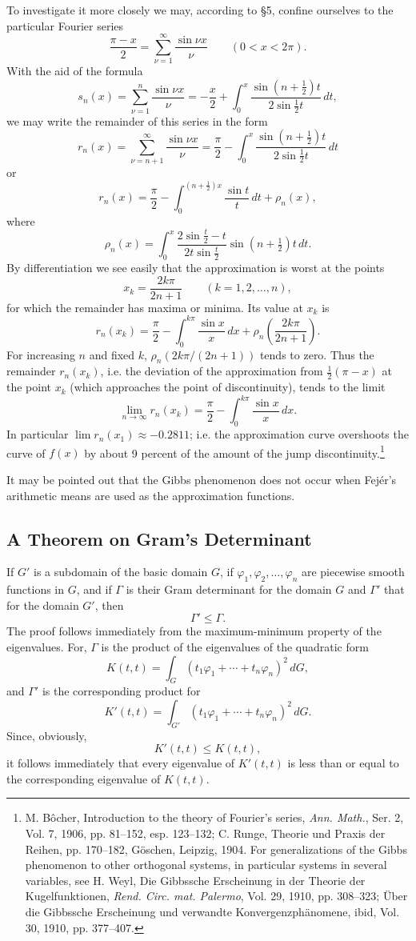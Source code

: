 To investigate it more closely we may, according to \S5, confine ourselves to the particular Fourier series
\[
\frac{\pi-x}{2}=\sum_{\nu=1}^\infty\frac{\sin\nu x}{\nu}
\qquad(0<x<2\pi).
\]
With the aid of the formula
\[
s_n(x)=\sum_{\nu=1}^n\frac{\sin\nu x}{\nu}
=-\frac{x}{2}+\int_0^x\frac{\sin(n+\tfrac12)t}{2\sin\tfrac12 t}\,dt,
\]
we may write the remainder of this series in the form
\[
r_n(x)=\sum_{\nu=n+1}^\infty\frac{\sin\nu x}{\nu}
=\frac{\pi}{2}-\int_0^x\frac{\sin(n+\tfrac12)t}{2\sin\tfrac12 t}\,dt
\]
or
\[
r_n(x)=\frac{\pi}{2}-\int_0^{(n+\tfrac12)x}\frac{\sin t}{t}\,dt+\rho_n(x),
\]
where
\[
\rho_n(x)=\int_0^x
\frac{2\sin\tfrac{t}{2}-t}{2t\sin\tfrac{t}{2}}
\sin(n+\tfrac12)t\,dt.
\]
By differentiation we see easily that the approximation is worst at the points
\[
x_k=\frac{2k\pi}{2n+1}\qquad(k=1,2,\ldots,n),
\]
for which the remainder has maxima or minima. Its value at $x_k$ is
\[
r_n(x_k)=\frac{\pi}{2}-\int_0^{k\pi}\frac{\sin x}{x}\,dx
+\rho_n\!\left(\frac{2k\pi}{2n+1}\right).
\]
For increasing $n$ and fixed $k$, $\rho_n(2k\pi/(2n+1))$ tends to zero. Thus the remainder $r_n(x_k)$, i.e. the deviation of the approximation from $\tfrac12(\pi-x)$ at the point $x_k$ (which approaches the point of discontinuity), tends to the limit
\[
\lim_{n\to\infty}r_n(x_k)
=\frac{\pi}{2}-\int_0^{k\pi}\frac{\sin x}{x}\,dx.
\]
In particular $\lim r_n(x_1)\approx-0.2811$; i.e. the approximation curve overshoots the curve of $f(x)$ by about 9 percent of the amount of the jump discontinuity.\footnote{M. B\^ocher, Introduction to the theory of Fourier's series, \emph{Ann. Math.}, Ser. 2, Vol. 7, 1906, pp. 81--152, esp. 123--132; C. Runge, Theorie und Praxis der Reihen, pp. 170--182, G\"oschen, Leipzig, 1904. For generalizations of the Gibbs phenomenon to other orthogonal systems, in particular systems in several variables, see H. Weyl, Die Gibbssche Erscheinung in der Theorie der Kugelfunktionen, \emph{Rend. Circ. mat. Palermo}, Vol. 29, 1910, pp. 308--323; \"Uber die Gibbssche Erscheinung und verwandte Konvergenzph\"anomene, ibid, Vol. 30, 1910, pp. 377--407.}

It may be pointed out that the Gibbs phenomenon does not occur when Fej\'er's arithmetic means are used as the approximation functions.

\subsection{A Theorem on Gram's Determinant}
If $G'$ is a subdomain of the basic domain $G$, if $\varphi_1,\varphi_2,\ldots,\varphi_n$ are piecewise smooth functions in $G$, and if $\Gamma$ is their Gram determinant for the domain $G$ and $\Gamma'$ that for the domain $G'$, then
\[
\Gamma'\le\Gamma.
\]
The proof follows immediately from the maximum-minimum property of the eigenvalues. For, $\Gamma$ is the product of the eigenvalues of the quadratic form
\[
K(t,t)=\int_G(t_1\varphi_1+\cdots+t_n\varphi_n)^2\,dG,
\]
and $\Gamma'$ is the corresponding product for
\[
K'(t,t)=\int_{G'}(t_1\varphi_1+\cdots+t_n\varphi_n)^2\,dG.
\]
Since, obviously,
\[
K'(t,t)\le K(t,t),
\]
it follows immediately that every eigenvalue of $K'(t,t)$ is less than or equal to the corresponding eigenvalue of $K(t,t)$.

